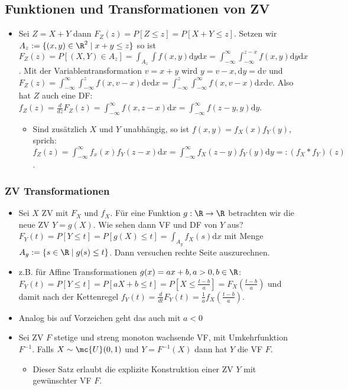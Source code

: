 \subsection{Funktionen und Transformationen von ZV}
\begin{itemize}
    \item Sei $Z = X + Y$ dann $F_Z(z) = P[Z \le z] = P[X + Y \le z]$. Setzen wir $A_z := \{(x, y) \in \R^2 \mid x + y \le z\}$ so ist $F_Z(z) = P[(X,Y) \in A_z] = \int_{A_z} \int  f(x,y) \mathrm{d}y\mathrm{d}x = \int_{-\infty}^{\infty} \int_{-\infty}^{z - x} f(x,y) \mathrm{d}y\mathrm{d}x$. Mit der Variablentransformation $v = x + y$ wird $y = v - x, \mathrm{d}y = \mathrm{d}v$ und $F_Z(z) = \int_{-\infty}^{\infty} \int_{-\infty}^{z} f(x, v - x) \mathrm{d}v \mathrm{d}x = \int_{-\infty}^{z} \int_{-\infty}^{\infty} f(x, v - x) \mathrm{d}x\mathrm{d}v$. Also hat $Z$ auch eine DF: $f_Z(z) = \frac{d}{dz} F_Z(z) = \int_{-\infty}^{\infty} f(x, z-x) \mathrm{d}x = \int_{-\infty}^{\infty} f(z - y,y) \mathrm{d}y$.
        \begin{itemize}
            \item Sind zusätzlich $X$ und $Y$ unabhängig, so ist $f(x,y) = f_X(x) f_Y(y)$, sprich: $f_Z(z) = \int_{-\infty}^{\infty} f_x(x) f_Y(z - x) \mathrm{d}x = \int_{-\infty}^{\infty} f_X(z - y)f_Y(y) \mathrm{d}y =: (f_X * f_Y)(z)$.
        \end{itemize}
\end{itemize}

\subsubsection{ZV Transformationen}
\begin{itemize}
    \item Sei $X$ ZV mit $F_X$ und $f_X$. Für eine Funktion $g: \R \to \R$ betrachten wir die neue ZV $Y = g(X)$. Wie sehen dann VF und DF von $Y$ aus?
         $F_Y(t) = P[Y \le t] = P[g(X) \le t] = \int_{A_g} f_X(s) \mathrm{d}x$ mit Menge $A_g := \{s \in \R \mid g(s) \le t\}$. Dann versuchen rechte Seite auszurechnen.
    \item z.B. für Affine Transformationen $g(x) = ax + b, a > 0, b \in \R$: $F_Y(t) = P[Y \le t] = P[aX + b \le t] = P[X \le \frac{t - b}{a}] = F_X( \frac{t - b}{a} )$ und damit nach der Kettenregel $f_Y(t) = \frac{d}{dt} F_Y(t) = \frac{1}{a} f_X (\frac{t - b}{a})$.
    \item Analog bis auf Vorzeichen geht das auch mit $a < 0$
\end{itemize}

\begin{itemize}
    \item Sei ZV $F$ stetige und streng monoton wachsende VF, mit Umkehrfunktion $F^{-1}$. Falls $X \sim \mc{U}(0, 1)$ und $Y = F^{-1}(X)$ dann hat $Y$ die VF $F$.
        \begin{itemize}
            \item Dieser Satz erlaubt die explizite Konstruktion einer ZV $Y$ mit gewünschter VF $F$.
        \end{itemize}
\end{itemize}
